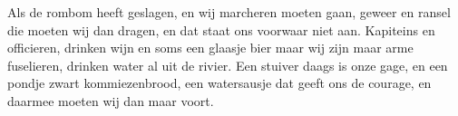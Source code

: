 \beginverse
Als de rombom heeft geslagen, en wij marcheren moeten gaan, geweer en ransel die moeten wij dan dragen, en dat staat ons voorwaar niet aan. 
\endverse
\beginchorus
Kapiteins en officieren, drinken wijn en soms een glaasje bier maar wij zijn maar arme fuselieren, drinken water al uit de rivier.
\endchorus
\beginverse
Een stuiver daags is onze gage, en een pondje zwart kommiezenbrood, een watersausje dat geeft ons de courage, en daarmee moeten wij dan maar voort.
\endverse
\endsong